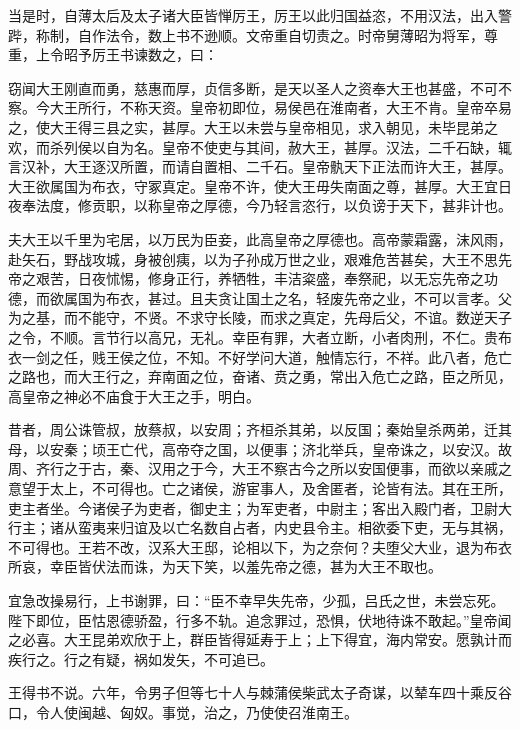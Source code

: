\documentclass[]{article}
\begin{document}
当是时，自薄太后及太子诸大臣皆惮厉王，厉王以此归国益恣，不用汉法，出入警跸，称制，自作法令，数上书不逊顺。文帝重自切责之。时帝舅薄昭为将军，尊重，上令昭予厉王书谏数之，曰：

窃闻大王刚直而勇，慈惠而厚，贞信多断，是天以圣人之资奉大王也甚盛，不可不察。今大王所行，不称天资。皇帝初即位，易侯邑在淮南者，大王不肯。皇帝卒易之，使大王得三县之实，甚厚。大王以未尝与皇帝相见，求入朝见，未毕昆弟之欢，而杀列侯以自为名。皇帝不使吏与其间，赦大王，甚厚。汉法，二千石缺，辄言汉补，大王逐汉所置，而请自置相、二千石。皇帝骫天下正法而许大王，甚厚。大王欲属国为布衣，守冢真定。皇帝不许，使大王毋失南面之尊，甚厚。大王宜日夜奉法度，修贡职，以称皇帝之厚德，今乃轻言恣行，以负谤于天下，甚非计也。

夫大王以千里为宅居，以万民为臣妾，此高皇帝之厚德也。高帝蒙霜露，沫风雨，赴矢石，野战攻城，身被创痍，以为子孙成万世之业，艰难危苦甚矣，大王不思先帝之艰苦，日夜怵惕，修身正行，养牺牲，丰洁粢盛，奉祭祀，以无忘先帝之功德，而欲属国为布衣，甚过。且夫贪让国土之名，轻废先帝之业，不可以言孝。父为之基，而不能守，不贤。不求守长陵，而求之真定，先母后父，不谊。数逆天子之令，不顺。言节行以高兄，无礼。幸臣有罪，大者立断，小者肉刑，不仁。贵布衣一剑之任，贱王侯之位，不知。不好学问大道，触情忘行，不祥。此八者，危亡之路也，而大王行之，弃南面之位，奋诸、贲之勇，常出入危亡之路，臣之所见，高皇帝之神必不庙食于大王之手，明白。

昔者，周公诛管叔，放蔡叔，以安周；齐桓杀其弟，以反国；秦始皇杀两弟，迁其母，以安秦；顷王亡代，高帝夺之国，以便事；济北举兵，皇帝诛之，以安汉。故周、齐行之于古，秦、汉用之于今，大王不察古今之所以安国便事，而欲以亲戚之意望于太上，不可得也。亡之诸侯，游宦事人，及舍匿者，论皆有法。其在王所，吏主者坐。今诸侯子为吏者，御史主；为军吏者，中尉主；客出入殿门者，卫尉大行主；诸从蛮夷来归谊及以亡名数自占者，内史县令主。相欲委下吏，无与其祸，不可得也。王若不改，汉系大王邸，论相以下，为之奈何？夫堕父大业，退为布衣所哀，幸臣皆伏法而诛，为天下笑，以羞先帝之德，甚为大王不取也。

宜急改操易行，上书谢罪，曰：``臣不幸早失先帝，少孤，吕氏之世，未尝忘死。陛下即位，臣怙恩德骄盈，行多不轨。追念罪过，恐惧，伏地待诛不敢起。''皇帝闻之必喜。大王昆弟欢欣于上，群臣皆得延寿于上；上下得宜，海内常安。愿孰计而疾行之。行之有疑，祸如发矢，不可追已。

王得书不说。六年，令男子但等七十人与棘蒲侯柴武太子奇谋，以辇车四十乘反谷口，令人使闽越、匈奴。事觉，治之，乃使使召淮南王。
\end{document}
